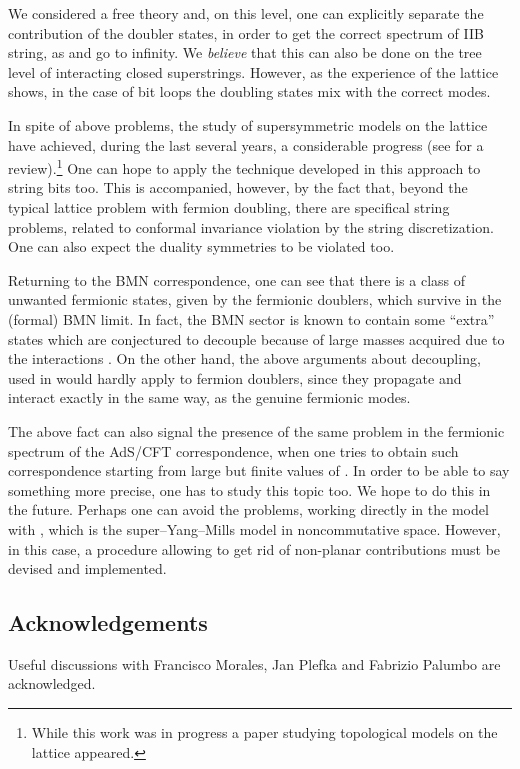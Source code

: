 \documentclass[a4paper]{article}
\begin{document}
We considered a free theory and, on this level, one can explicitly
separate the contribution of the doubler states, in order to get
the correct spectrum of IIB string, as \coordHE{} and \coordHE{} go to infinity.
We \emph{believe} that this can also be done on the tree level of
interacting closed superstrings. However, as the experience of the
lattice shows, in the case of bit loops the doubling states mix
with the correct modes.

In spite of above problems, the study of supersymmetric models on
the lattice have achieved, during the last several years, a
considerable progress (see
\cite{Montvay:1998ak,Montvay:2001aj,Kaplan:2002zs} for a
review).\footnote{While this work was in progress a paper
\cite{Catterall:2003wd} studying topological models on the lattice
appeared.} One can hope to apply the technique developed in this
approach to string bits too. This is accompanied, however, by the
fact that, beyond the typical lattice problem with fermion doubling,
there are specifical string problems, related to conformal
invariance violation by the string discretization. One can also
expect the duality symmetries to be violated too.

Returning to the BMN correspondence, one can see that there is a
class of unwanted fermionic states, given by the fermionic
doublers, which survive in the (formal) BMN limit. In fact, the
BMN sector is known to contain some ``extra'' states which are
conjectured to decouple because of large masses acquired due to
the interactions \cite{Berenstein:2002jq}. On the other hand, the
above arguments about decoupling, used in \cite{Berenstein:2002jq}
would hardly apply to fermion doublers, since they propagate and
interact exactly in the same way, as the genuine fermionic modes.

The above fact can also signal the presence of the same problem in
the fermionic spectrum of the AdS/CFT correspondence, when one
tries to obtain such correspondence starting from large but finite
values of \coordHE{}. In order to be able to say something more precise, one has
to study this topic too. We hope to do this in the future.
Perhaps one can avoid the problems, working directly in the model
with \coordHE{}, which is the super--Yang--Mills model in
noncommutative space. However, in this case, a procedure allowing
to get rid of non-planar contributions must be devised and
implemented.

\subsection*{Acknowledgements}
Useful discussions with Francisco Morales, Jan Plefka and
Fabrizio Palumbo are acknowledged.
\end{document}
